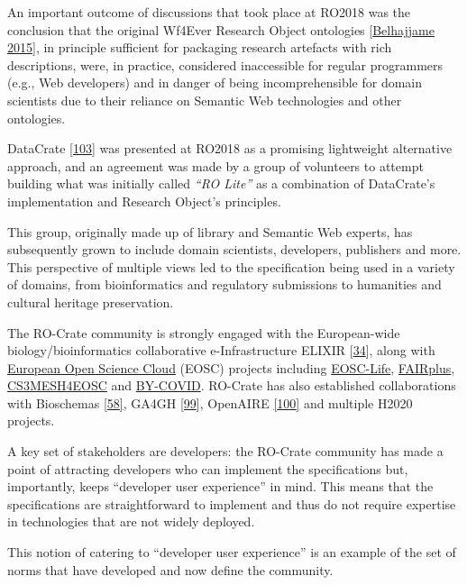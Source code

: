 An important outcome of discussions that took place at RO2018 was the
conclusion that the original Wf4Ever Research Object ontologies
{[}\href{https://doi.org/10.1016/j.websem.2015.01.003}{Belhajjame 2015}{]}, in
principle sufficient for packaging research artefacts with rich
descriptions, were, in practice, considered inaccessible for regular
programmers (e.g., Web developers) and in danger of being
incomprehensible for domain scientists due to their reliance on Semantic
Web technologies and other ontologies.

DataCrate {[}\href{https://doi.org/10.5281/zenodo.1445817}{103}{]} was
presented at RO2018 as a promising lightweight alternative approach, and
an agreement was made by a group of volunteers to attempt building what
was initially called \emph{``RO Lite''} as a combination of DataCrate's
implementation and Research Object's principles.

This group, originally made up of library and Semantic Web experts, has
subsequently grown to include domain scientists, developers, publishers
and more. This perspective of multiple views led to the specification
being used in a variety of domains, from bioinformatics and regulatory
submissions to humanities and cultural heritage preservation.

The RO-Crate community is strongly engaged with the European-wide
biology/bioinformatics collaborative e-Infrastructure ELIXIR
{[}\href{https://doi.org/10.1016/j.tibtech.2012.02.002}{34}{]}, along
with \href{https://eosc.eu/}{European Open Science Cloud} (EOSC)
projects including \href{https://www.eosc-life.eu/}{EOSC-Life},
\href{https://fairplus-project.eu/}{FAIRplus},
\href{https://cs3mesh4eosc.eu/}{CS3MESH4EOSC} and
\href{https://by-covid.eu/}{BY-COVID}. RO-Crate has also established
collaborations with Bioschemas
\href{https://iswc2017.semanticweb.org/paper-579/}{{[}58{]}}, GA4GH
{[}\href{https://doi.org/10.1016/j.xgen.2021.100029}{99}{]}, OpenAIRE
\href{https://doi.org/10.5860/crln.76.6.9326}{{[}100{]}} and multiple
H2020 projects.

A key set of stakeholders are developers: the RO-Crate community has
made a point of attracting developers who can implement the
specifications but, importantly, keeps ``developer user experience'' in
mind. This means that the specifications are straightforward to
implement and thus do not require expertise in technologies that are not
widely deployed.

This notion of catering to ``developer user experience'' is an example
of the set of norms that have developed and now define the community.

